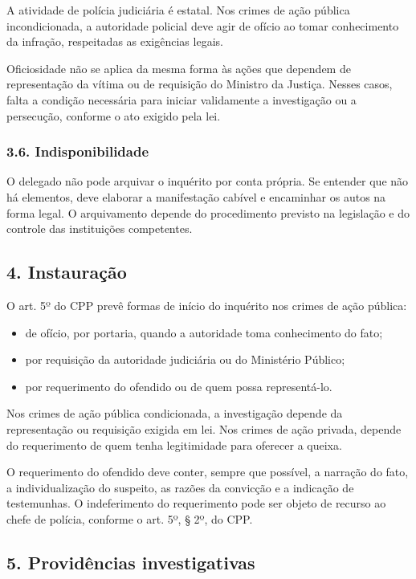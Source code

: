 \documentclass[11pt,a4paper]{article}
\begin{document}
A atividade de polícia judiciária é estatal. Nos crimes de ação pública incondicionada, a autoridade policial deve agir de ofício ao tomar conhecimento da infração, respeitadas as exigências legais.

Oficiosidade não se aplica da mesma forma às ações que dependem de representação da vítima ou de requisição do Ministro da Justiça. Nesses casos, falta a condição necessária para iniciar validamente a investigação ou a persecução, conforme o ato exigido pela lei.

\subsubsection*{3.6. Indisponibilidade}

O delegado não pode arquivar o inquérito por conta própria. Se entender que não há elementos, deve elaborar a manifestação cabível e encaminhar os autos na forma legal. O arquivamento depende do procedimento previsto na legislação e do controle das instituições competentes.

\subsection*{4. Instauração}

O art. 5º do CPP prevê formas de início do inquérito nos crimes de ação pública:

\begin{itemize}
  \item de ofício, por portaria, quando a autoridade toma conhecimento do fato;
  \item por requisição da autoridade judiciária ou do Ministério Público;
  \item por requerimento do ofendido ou de quem possa representá-lo.
\end{itemize}

Nos crimes de ação pública condicionada, a investigação depende da representação ou requisição exigida em lei. Nos crimes de ação privada, depende do requerimento de quem tenha legitimidade para oferecer a queixa.

O requerimento do ofendido deve conter, sempre que possível, a narração do fato, a individualização do suspeito, as razões da convicção e a indicação de testemunhas. O indeferimento do requerimento pode ser objeto de recurso ao chefe de polícia, conforme o art. 5º, § 2º, do CPP.

\subsection*{5. Providências investigativas}
\end{document}
